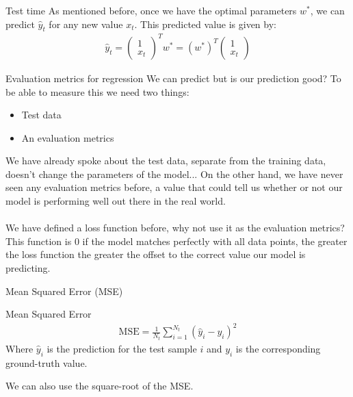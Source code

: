 	
	\begin{parag}{Test time}
	    As mentioned before, once we have the optimal parameters $w^{\ast}$, we can predict $\hat{y}_t$ for any new value $x_t$. This predicted value is given by:
		\begin{align*} 
			\hat{y}_t = \begin{pmatrix} 1 \\ x_t \end{pmatrix}^{T} w^{\ast} = \left(w^{\ast}\right)^{T}\begin{pmatrix} 1 \\ x_t \end{pmatrix} 
		\end{align*}
	\end{parag}
	\begin{parag}{Evaluation metrics for regression}
	    We can predict but is our prediction good? To be able to measure this we need two things:
		\begin{itemize}
			\item Test data
			\item An evaluation metrics
		\end{itemize}
		We have already spoke about the test data, separate from the training data, doesn't change the parameters of the model... On the other hand, we have never seen any evaluation metrics before, a value that could tell us whether or not our model is performing well out there in the real world.\\
		$ $\\
		We have defined a loss function before, why not use it as the evaluation metrics? This function is $0$ if the model matches perfectly with all data points, the greater the loss function the greater the offset to the correct value our model is predicting.
	\end{parag}
	\begin{parag}{Mean Squared Error (MSE)}
		\begin{definition}{Mean Squared Error}
	    \begin{align*} \text{MSE} = \frac{1}{N_t} \sum_{i = 1}^{N_t}\left(\hat{y}_i - y_i\right)^2 \end{align*}
		Where $\hat{y}_i$ is the prediction for the test sample $i$ and $y_i$ is the corresponding ground-truth value.
	    \end{definition}
		We can also use the square-root of the MSE.
	\end{parag}
